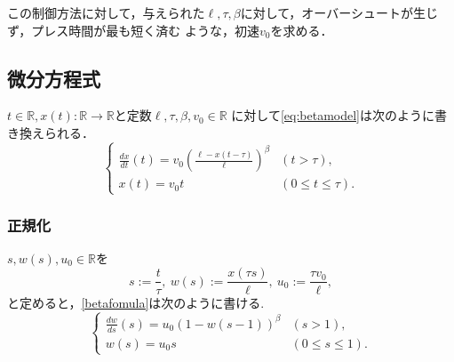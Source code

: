 \documentclass [dvipdfmx] {jsarticle}
\numberwithin{equation}{section}
\theoremstyle{definition} %
\theoremstyle{definition} %
\begin{document}
この制御方法に対して，与えられた$\ell,\tau,\beta$に対して，オーバーシュートが生じず，プレス時間が最も短く済む
ような，初速$v_0$を求める．









\subsection{微分方程式}
$t\in\mathbb{R},x(t)\colon\mathbb{R}\rightarrow\mathbb{R}$と定数$\ell,\tau,\beta,v_0\in\mathbb{R}$
に対して\eqref{eq:betamodel}は次のように書き換えられる．
\begin{equation}\label{betafomula}\begin{cases}
    \displaystyle\frac{dx}{dt}(t)=v_0\left(\frac{\ell-x(t-\tau)}{\ell}\right)^\beta &(t>\tau),\\
    x(t)=v_0 t &(0\le t \le \tau).
\end{cases}\end{equation}


\subsubsection{正規化}
$s,w(s),u_0\in\mathbb{R}$を
\begin{equation}
    s:=\frac{t}{\tau},\ w(s):=\frac{x(\tau s)}{\ell},\ u_0:=\frac{\tau v_0}{\ell},
\end{equation}
と定めると，\eqref{betafomula}は次のように書ける.
\begin{equation}\label{betafomula2}\begin{cases}
    \displaystyle\frac{dw}{ds}(s)=u_0(1-w(s-1))^\beta &(s>1),\\
    w(s)=u_0 s &(0\le s \le 1).
\end{cases}\end{equation}
\end{document}
